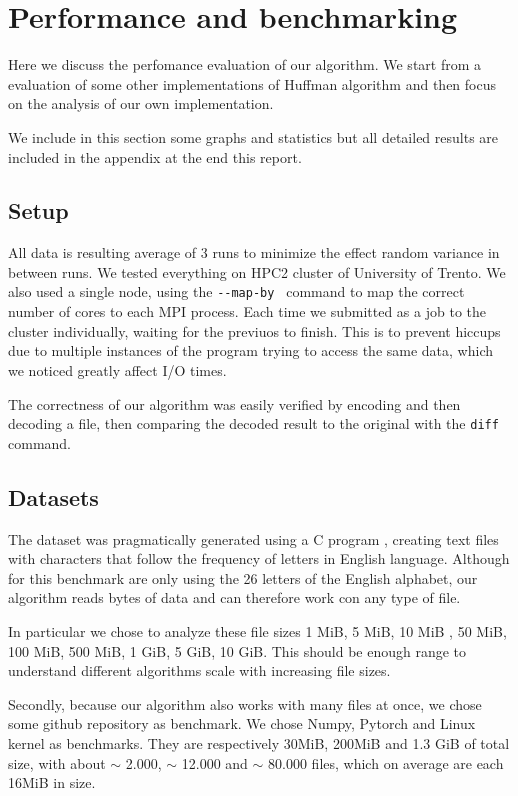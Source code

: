 \section{Performance and benchmarking}
Here we discuss the perfomance evaluation of our algorithm.
We start from a evaluation of some other implementations of Huffman algorithm and then focus on the analysis of our own implementation. 

We include in this section some graphs and statistics but all detailed results are included in the appendix at the end this report.
\subsection{Setup}
All data is resulting average of 3 runs to minimize the effect random variance in between runs.
We tested everything on HPC2 cluster of University of Trento.
We also used a single node, using the \verb|--map-by | command to map the correct number of cores to each MPI process.
Each time we submitted as a job to the cluster individually, waiting for the previuos to finish. This is to prevent hiccups due to multiple instances of the program trying to access the same data, which we noticed greatly affect I/O times.

The correctness of our algorithm was easily verified by encoding and then decoding a file, then comparing the decoded result to the original with the \verb|diff| command.
\subsection{Datasets}
The dataset was pragmatically generated using a C program , creating text files with characters that follow the frequency of letters in English language. Although for this benchmark are only using the 26 letters of the English alphabet, our algorithm reads bytes of data and can therefore work con any type of file.

In particular we chose to analyze these file sizes 1 MiB, 5 MiB, 10 MiB , 50 MiB, 100 MiB, 500 MiB, 1 GiB, 5 GiB, 10 GiB. This should be enough range to understand different algorithms scale with increasing file sizes.

Secondly, because our algorithm also works with many files at once, we chose some github repository as benchmark. We chose Numpy, Pytorch and Linux kernel as benchmarks. They are respectively 30MiB, 200MiB and  1.3 GiB of total size, with about $\sim$ 2.000, $\sim$ 12.000 and  $\sim$ 80.000 files, which on average are each 16MiB in size.

